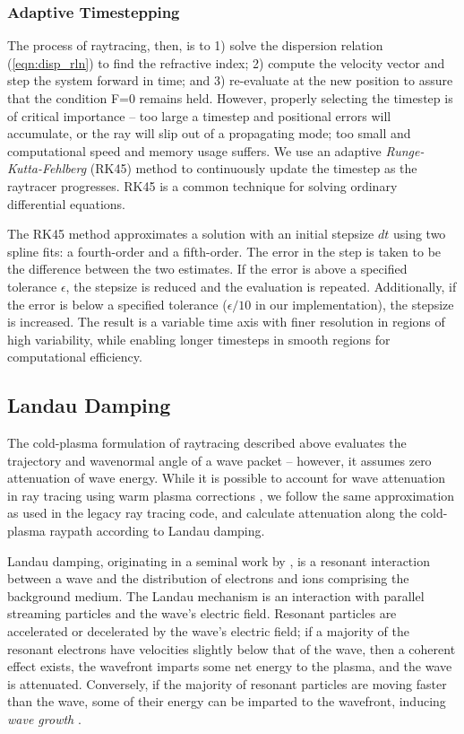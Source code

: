 \subsubsection{Adaptive Timestepping}
The process of raytracing, then, is to 1) solve the dispersion relation (\ref{eqn:disp_rln}) to find the refractive index; 2) compute the velocity vector and step the system forward in time; and 3) re-evaluate at the new position to assure that the condition F=0 remains held. However, properly selecting the timestep is of critical importance -- too large a timestep and positional errors will accumulate, or the ray will slip out of a propagating mode; too small and computational speed and memory usage suffers. We use an adaptive \emph{Runge-Kutta-Fehlberg} (RK45) \citep{Fehlberg1969, Mathews2004} method to continuously update the timestep as the raytracer progresses. RK45 is a common technique for solving ordinary differential equations.

The RK45 method approximates a solution with an initial stepsize $dt$ using two spline fits: a fourth-order and a fifth-order. The error in the step is taken to be the difference between the two estimates. If the error is above a specified tolerance $\epsilon$, the stepsize is reduced and the evaluation is repeated. Additionally, if the error is below a specified tolerance ($\epsilon/10$ in our implementation), the stepsize is increased. The result is a variable time axis with finer resolution in regions of high variability, while enabling longer timesteps in smooth regions for computational efficiency.

\subsection{Landau Damping}
The cold-plasma formulation of raytracing described above evaluates the trajectory and wavenormal angle of a wave packet -- however, it assumes zero attenuation of wave energy. While it is possible to account for wave attenuation in ray tracing using warm plasma corrections \citep{Sazhin1993, Henyey1980}, we follow the same approximation as used in the legacy ray tracing code, and calculate attenuation along the cold-plasma raypath according to Landau damping.

Landau damping, originating in a seminal work by \cite{Landau1946}, is a resonant interaction between a wave and the distribution of electrons and ions comprising the background medium. The Landau mechanism is an interaction with parallel streaming particles and the wave's electric field. Resonant particles are accelerated or decelerated by the wave's electric field; if a majority of the resonant electrons have velocities slightly below that of the wave, then a coherent effect exists, the wavefront imparts some net energy to the plasma, and the wave is attenuated. Conversely, if the majority of resonant particles are moving faster than the wave, some of their energy can be imparted to the wavefront, inducing \emph{wave growth} \citep{Chen1983, Kulkarni2009}. 

